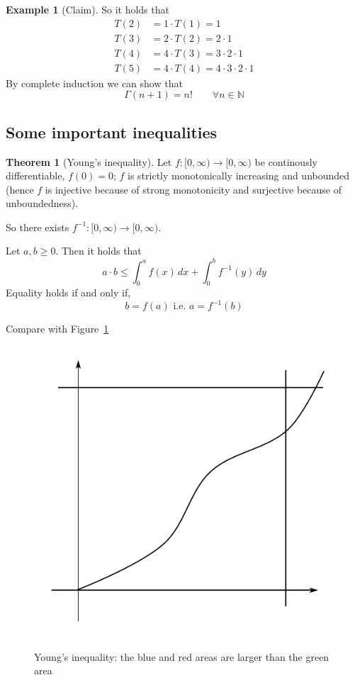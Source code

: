 \documentclass[a4paper,landscape,twocolumn]{article}
\theoremstyle{definition}
\newtheorem{theorem}{Theorem}
\newtheorem{ex}{Example}
\begin{document}
\begin{ex}[Claim]
  So it holds that
  \begin{align*}
    T(2) &= 1 \cdot T(1) = 1 \\
    T(3) &= 2 \cdot T(2) = 2 \cdot 1 \\
    T(4) &= 4 \cdot T(3) = 3 \cdot 2 \cdot 1 \\
    T(5) &= 4 \cdot T(4) = 4 \cdot 3 \cdot 2 \cdot 1
  \end{align*}
  By complete induction we can show that
  \[ \Gamma(n+1) = n! \qquad \forall n \in \mathbb N \]
\end{ex}

\subsection{Some important inequalities}
%
\begin{theorem}[Young's inequality]
  Let $f: [0, \infty) \to [0,\infty)$ be continously differentiable,
  $f(0) = 0$; $f$ is strictly monotonically increasing and unbounded
  (hence $f$ is injective because of strong monotonicity
  and surjective because of unboundedness).

  So there exists $f^{-1}: [0,\infty) \to [0,\infty)$.

  Let $a,b \geq 0$. Then it holds that
  \[
    a \cdot b \leq \int_0^a f(x) \, dx + \int_0^b f^{-1}(y) \, dy
  \]
  Equality holds if and only if,
  \[
    b = f(a) \text{ i.e. } a = f^{-1}(b)
  \]

  Compare with Figure~\ref{img:youngs-ineq}
\end{theorem}
\begin{figure}[!h]
  \begin{center}
    \includegraphics{img/youngs_inequality.pdf}
    \caption{Young's inequality: the blue and red areas are larger than the green area}
    \label{img:youngs-ineq}
  \end{center}
\end{figure}
\end{document}
